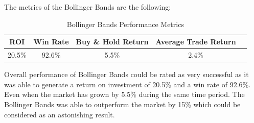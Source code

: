 \documentclass{imc-inf}
\begin{document}
				The metrics of the Bollinger Bands are the following:
				\begin{table}[h!]
					\centering
					\begin{tabular}{|c|c|c|c|c|}
						\hline
						\textbf{ROI} & \textbf{Win Rate} & \textbf{Buy \& Hold Return} & \textbf{Average Trade Return} \\ \hline
						20.5\%         & 92.6\%               & 5.5\%                         & 2.4\%                           \\ \hline
					\end{tabular}
					\caption{Bollinger Bands Performance Metrics}
					\label{tab:bollinger_bands_performance_metrics}
				
				\end{table}
				Overall performance of Bollinger Bands could be rated as very successful as it was able to generate a return on investment of 20.5\% and a win rate of 92.6\%.
				Even when the market has grown by 5.5\% during the same time period. The Bollinger Bands was able to outperform the market by 15\% which could be considered as
				an astonishing result.
\end{document}
